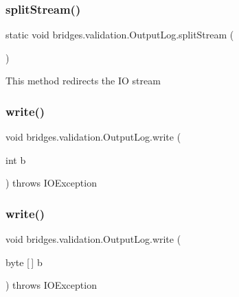 \subsubsection{\texorpdfstring{split\+Stream()}{splitStream()}}
{\footnotesize\ttfamily static void bridges.\+validation.\+Output\+Log.\+split\+Stream (\begin{DoxyParamCaption}{ }\end{DoxyParamCaption})\hspace{0.3cm}{\ttfamily [static]}}

This method redirects the IO stream \hypertarget{classbridges_1_1validation_1_1_output_log_a68ed2055f1a0626674675354feeb9d54}{}\label{classbridges_1_1validation_1_1_output_log_a68ed2055f1a0626674675354feeb9d54} 
\subsubsection{\texorpdfstring{write()}{write()}\hspace{0.1cm}{\footnotesize\ttfamily [1/3]}}
{\footnotesize\ttfamily void bridges.\+validation.\+Output\+Log.\+write (\begin{DoxyParamCaption}\item[{int}]{b }\end{DoxyParamCaption}) throws I\+O\+Exception}

\hypertarget{classbridges_1_1validation_1_1_output_log_a6489f70aa4e2903456ed05315dd59f31}{}\label{classbridges_1_1validation_1_1_output_log_a6489f70aa4e2903456ed05315dd59f31} 
\subsubsection{\texorpdfstring{write()}{write()}\hspace{0.1cm}{\footnotesize\ttfamily [2/3]}}
{\footnotesize\ttfamily void bridges.\+validation.\+Output\+Log.\+write (\begin{DoxyParamCaption}\item[{byte \mbox{[}$\,$\mbox{]}}]{b }\end{DoxyParamCaption}) throws I\+O\+Exception}

